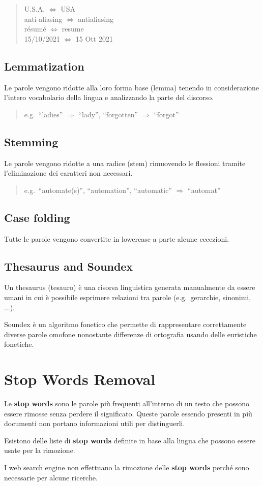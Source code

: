 \begin{quote}
  U.S.A. $\Leftrightarrow$ USA\\
  anti-aliasing $\Leftrightarrow$ antialiasing\\
  résumé $\Leftrightarrow$ resume\\
  15/10/2021 $\Leftrightarrow$ 15 Ott 2021
\end{quote}

\subsection*{Lemmatization}
Le parole vengono ridotte alla loro forma base (lemma) tenendo in considerazione l'intero vocabolario della lingua e analizzando la parte del discorso.

\begin{quote}
  e.g.\ ``ladies'' $\Rightarrow$ ``lady'', ``forgotten'' $\Rightarrow$ ``forgot''
\end{quote}

\subsection*{Stemming}
Le parole vengono ridotte a una radice (stem) rimuovendo le flessioni tramite l'eliminazione dei caratteri non necessari.

\begin{quote}
  e.g.\ ``automate(s)'', ``automation'', ``automatic'' $\Rightarrow$ ``automat''
\end{quote}

\subsection*{Case folding}
Tutte le parole vengono convertite in lowercase a parte alcune eccezioni.

\subsection*{Thesaurus and Soundex}
Un thesaurus (tesauro) è una risorsa linguistica generata manualmente da essere umani in cui è possibile esprimere relazioni tra parole (e.g.\ gerarchie, sinonimi, ...).

Soundex è un algoritmo fonetico che permette di rappresentare correttamente diverse parole omofone nonostante differenze di ortografia usando delle euristiche fonetiche.


\section{Stop Words Removal}
Le \textbf{stop words} sono le parole più frequenti all'interno di un testo che possono essere rimosse senza perdere il significato.
Queste parole essendo presenti in più documenti non portano informazioni utili per distinguerli.

Esistono delle liste di \textbf{stop words} definite in base alla lingua che possono essere usate per la rimozione.

I web search engine non effettuano la rimozione delle \textbf{stop words} perché sono necessarie per alcune ricerche.
